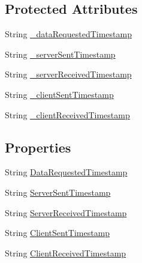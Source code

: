 \subsection*{Protected Attributes}
\begin{DoxyCompactItemize}
\item 
String \hyperlink{class_web_analyzer_1_1_models_1_1_base_1_1_basic_raw_data_aedbac89d08105df36dd737b14e10a76e}{\+\_\+data\+Requested\+Timestamp}
\item 
String \hyperlink{class_web_analyzer_1_1_models_1_1_base_1_1_basic_raw_data_af9aa8b7df49b8d4fa87f68778d95f7c1}{\+\_\+server\+Sent\+Timestamp}
\item 
String \hyperlink{class_web_analyzer_1_1_models_1_1_base_1_1_basic_raw_data_aae963365cbe30a12e3cb81b85a9cc5d6}{\+\_\+server\+Received\+Timestamp}
\item 
String \hyperlink{class_web_analyzer_1_1_models_1_1_base_1_1_basic_raw_data_ac64180f784b9c3a4951a8a9855e30c55}{\+\_\+client\+Sent\+Timestamp}
\item 
String \hyperlink{class_web_analyzer_1_1_models_1_1_base_1_1_basic_raw_data_ae6a9f7b387d7f7090ebcecf8e03050aa}{\+\_\+client\+Received\+Timestamp}
\end{DoxyCompactItemize}
\subsection*{Properties}
\begin{DoxyCompactItemize}
\item 
String \hyperlink{class_web_analyzer_1_1_models_1_1_base_1_1_basic_raw_data_a80650296bb277246c1e0877c6d4e60aa}{Data\+Requested\+Timestamp}
\item 
String \hyperlink{class_web_analyzer_1_1_models_1_1_base_1_1_basic_raw_data_a21d2fe8ffde6c6af33eef4e81922eecf}{Server\+Sent\+Timestamp}
\item 
String \hyperlink{class_web_analyzer_1_1_models_1_1_base_1_1_basic_raw_data_ac94887acc1bf4d73f6a43c27c42cd02c}{Server\+Received\+Timestamp}
\item 
String \hyperlink{class_web_analyzer_1_1_models_1_1_base_1_1_basic_raw_data_a7a7928ba3d435ec7ad5a0d4cf85a33d3}{Client\+Sent\+Timestamp}
\item 
String \hyperlink{class_web_analyzer_1_1_models_1_1_base_1_1_basic_raw_data_a095b9f2a1ccbd4d32a9022a89d22ede3}{Client\+Received\+Timestamp}
\end{DoxyCompactItemize}


